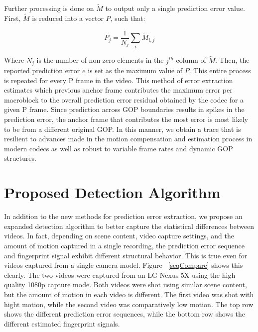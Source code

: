 Further processing is done on $\tilde{M}$ to output only a single prediction error value. First, $\tilde{M}$ is reduced into a vector $P$, such that:

\begin{equation}
  P_{j} = \frac{1}{N_{j}} \sum_{i}{\tilde{M}_{i,j}}
\end{equation}

Where $N_{j}$ is the number of non-zero elements in the $j^{th}$ column of $\tilde{M}$. Then, the reported prediction error $e$ is set as the maximum value of $P$. This entire process is repeated for every P frame in the video. This method of error extraction estimates which previous anchor frame contributes the maximum error per macroblock to the overall prediction error residual obtained by the codec for a given P frame. Since prediction across GOP boundaries results in spikes in the prediction error, the anchor frame that contributes the most error is most likely to be from a different original GOP. In this manner, we obtain a trace that is resilient to advances made in the motion compensation and estimation process in modern codecs as well as robust to variable frame rates and dynamic GOP structures.

\section{Proposed Detection Algorithm}

In addition to the new methods for prediction error extraction, we propose an expanded detection algorithm to better capture the statistical differences between videos. In fact, depending on scene content, video capture settings, and the amount of motion captured in a single recording, the prediction error sequence and fingerprint signal exhibit different structural behavior. This is true even for videos captured from a single camera model. Figure ~\ref{seqCompare} shows this clearly. The two videos were captured from an LG Nexus 5X using the high quality 1080p capture mode. Both videos were shot using similar scene content, but the amount of motion in each video is different. The first video was shot with hight motion, while the second video was comparatively low motion. The top row shows the different prediction error sequences, while the bottom row shows the different estimated fingerprint signals.

